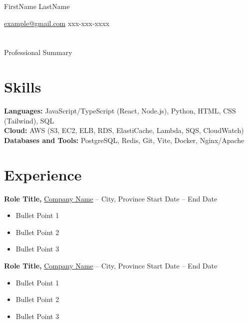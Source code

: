\documentclass[11pt]{article}       %
\begin{document}
	
	\centerline{\Huge FirstName LastName}
	
	\vspace{5pt}
	
	\centerline{
		\href{mailto:example@gmail.com}{example@gmail.com}
		\hspace{2em}
		xxx-xxx-xxxx
	}
	
	\vspace{-25pt}
	
	\section*{}
	Professional Summary

	\vspace{-6.5pt}
	
	\def\java{0}
	
	\section*{Skills}
	\textbf{Languages:}
	JavaScript/TypeScript (React, Node.js),
	Python,
	HTML,
	CSS (Tailwind),
	SQL
	\\
	\textbf{Cloud:} AWS (S3, EC2, ELB, RDS, ElastiCache, Lambda, SQS, CloudWatch)  \\
	\textbf{Databases and Tools:} PostgreSQL, Redis, Git, Vite, Docker, Nginx/Apache
	
	\vspace{-6.5pt}
	
	\section*{Experience}
	\textbf{Role Title,} \href{https://company.com}{Company Name} -- City, Province \hfill Start Date -- End Date \\
	\vspace{-9pt}
	\begin{itemize}
		\item Bullet Point 1
		\item Bullet Point 2
		\item Bullet Point 3
	\end{itemize}

	\textbf{Role Title,} \href{https://company.com}{Company Name} -- City, Province \hfill Start Date -- End Date \\
	\vspace{-9pt}
	\begin{itemize}
		\item Bullet Point 1
		\item Bullet Point 2
		\item Bullet Point 3
	\end{itemize}
	
\end{document}
